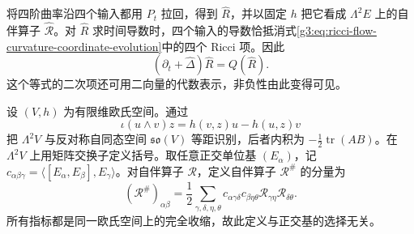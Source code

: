 \ProseParagraphBreak
将四阶曲率沿四个输入都用 \(P_t\) 拉回，得到 \(\widehat R\)，并以固定 \(h\) 把它看成 \(\Lambda^2E\) 上的自伴算子 \(\widehat{\mathcal R}\)。对 \(\widehat R\) 求时间导数时，四个输入的导数恰抵消式\eqref{g3:eq:ricci-flow-curvature-coordinate-evolution}中的四个 Ricci 项。因此
\[
	(\partial_t+\widehat\Delta)\widehat R=Q(\widehat R).
\]
这个等式的二次项还可用二向量的代数表示，非负性由此变得可见。

\begin{definition}\label{g3:def:ricci-flow-lie-square}
	设 \((V,h)\) 为有限维欧氏空间。通过
	\[
		\iota(u\wedge v)z=h(v,z)u-h(u,z)v
	\]
	把 \(\Lambda^2V\) 与反对称自同态空间 \(\mathfrak{so}(V)\) 等距识别，后者内积为 \(-\tfrac12\operatorname{tr}(AB)\)。在 \(\Lambda^2V\) 上用矩阵交换子定义括号。取任意正交单位基 \((E_\alpha)\)，记
	\(c_{\alpha\beta\gamma}=\langle[E_\alpha,E_\beta],E_\gamma\rangle\)。对自伴算子 \(\mathcal R\)，定义自伴算子 \(\mathcal R^\#\) 的分量为
	\begin{equation}\label{g3:eq:ricci-flow-lie-square}
		(\mathcal R^\#)_{\alpha\beta}
		=\frac12\sum_{\gamma,\delta,\eta,\theta}
		c_{\alpha\gamma\delta}c_{\beta\eta\theta}
		\mathcal R_{\gamma\eta}\mathcal R_{\delta\theta}.
	\end{equation}
	所有指标都是同一欧氏空间上的完全收缩，故此定义与正交基的选择无关。
\end{definition}


